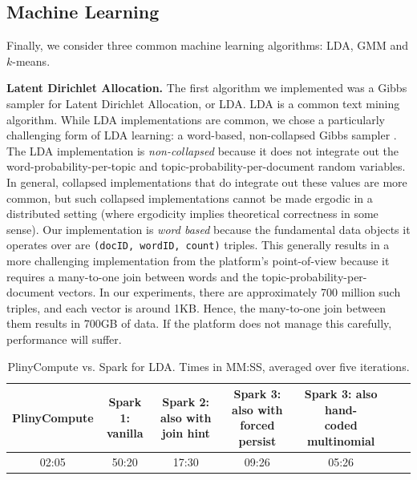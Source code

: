 \subsection {Machine Learning}

Finally, we consider three common machine learning algorithms: LDA,
GMM and $k$-means. 

\vspace{5pt}
\noindent
\textbf{Latent Dirichlet Allocation.}
The first algorithm we implemented was a Gibbs sampler for
Latent Dirichlet Allocation, or LDA.  LDA is a common text mining algorithm.
While LDA implementations are common, we
chose a particularly challenging form of LDA learning:
a 
word-based,
non-collapsed Gibbs sampler \cite{jermaineExperimental}.  The LDA implementation
is \emph{non-collapsed} because it does not integrate out the word-probability-per-topic
and topic-probability-per-document random variables. In general, collapsed implementations
that do integrate out these values are more common, but such collapsed implementations
cannot be made ergodic in a distributed setting
(where ergodicity implies theoretical correctness in some sense).
Our implementation is
\emph{word based} because the fundamental data objects it operates over are \texttt{(docID, wordID, count)} 
triples.  This generally results in a more challenging
implementation from the platform's point-of-view because it requires a many-to-one join between words
and the topic-probability-per-document vectors.  In our experiments, there are approximately
700 million such triples, and each vector is around 1KB.  Hence, the many-to-one join between them results in
700GB of data.  If the platform does not manage this carefully, performance will suffer.

\begin{table}[t]
\small
\begin{center}
\begin{tabular}{|c||c|c|c|c|c|c|}
\hline
PlinyCompute & \makecell{Spark 1: \\vanilla} & \makecell{Spark 2: also with \\join hint} & \makecell{Spark 3: also with \\forced persist} & \makecell{Spark 3: also hand-\\coded multinomial} \\
\hline
02:05 & 50:20 & 17:30 & 09:26 & 05:26 \\
\hline
\end{tabular}
\caption{PlinyCompute vs. Spark for LDA. Times in MM:SS, averaged over five iterations.}
\label{fig:LDA}
\end{center}
\vspace{-20pt}
\end{table}

